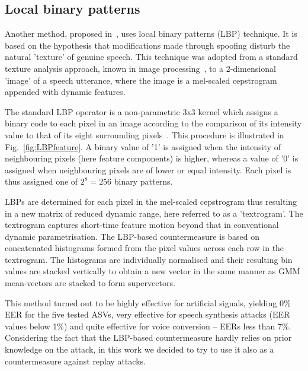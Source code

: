 \subsection{Local binary patterns}


Another method, proposed in~\cite{Alegre2013a}, uses local binary patterns (LBP) technique. It is based on the hypothesis that modifications made through spoofing disturb the natural 'texture' of genuine speech. This technique was adopted from a standard texture analysis approach, known in image processing~\cite{Ojala2002}, to a 2-dimensional 'image' of a speech utterance, where the image is a mel-scaled cepstrogram appended with dynamic features. 

The standard LBP operator is a non-parametric 3x3 kernel which assigns a binary code to each pixel in an image according to the comparison of its intensity value to that of its eight surrounding pixels~\cite{Ojala2002}. This procedure is illustrated in Fig.~\ref{fig:LBPfeature}.  A binary value of '1' is assigned when the intensity of neighbouring pixels (here feature components) is higher, whereas a value of '0' is assigned when neighbouring pixels are of lower or equal intensity. Each pixel is thus assigned one of $2^8=256$ binary patterns.

LBPs are determined for each pixel in the mel-scaled cepstrogram thus resulting in a new matrix of reduced dynamic range, here referred to as a 'textrogram'.  The textrogram captures short-time feature motion beyond that in conventional dynamic parametrisation.  The LBP-based countermeasure is based on concatenated histograms formed from the pixel values across each row in the textrogram.  The histograms are individually normalised and their resulting bin values are stacked vertically to obtain a new vector in the same manner as GMM mean-vectors are stacked to form supervectors.  


This method turned out to be  highly effective for artificial signals, yielding 0\% EER for the five tested ASVs, very effective for speech synthesis attacks (EER values below 1\%) and quite effective for voice conversion -- EERs less than 7\%. Considering the fact that the LBP-based countermeasure hardly relies on prior knowledge on the attack, in this work we decided to try to use it also as a countermeasure against replay attacks.


